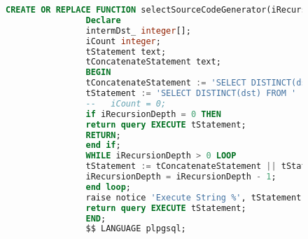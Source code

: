 \documentclass[a4paper,landscape]{scrartcl}
\begin{document}
        \newpage
        \begin{figure}
            \centering
            \begin{lstlisting}[language=SQL,caption = selectSourceCodeGenerator,frame=single]
                CREATE OR REPLACE FUNCTION selectSourceCodeGenerator(iRecursionDepth integer, sTable text) RETURNS SETOF integer AS $$
                Declare
                intermDst_ integer[];
                iCount integer;
                tStatement text;
                tConcatenateStatement text;
                BEGIN
                tConcatenateStatement := 'SELECT DISTINCT(dst) FROM ' || sTable || ' WHERE src IN(';
                tStatement := 'SELECT DISTINCT(dst) FROM ' || sTable || ' WHERE src IN(765)';
                --   iCount = 0;
                if iRecursionDepth = 0 THEN
                return query EXECUTE tStatement;
                RETURN;
                end if;
                WHILE iRecursionDepth > 0 LOOP
                tStatement := tConcatenateStatement || tStatement ||')';
                iRecursionDepth = iRecursionDepth - 1;
                end loop;
                raise notice 'Execute String %', tStatement;
                return query EXECUTE tStatement;
                END;
                $$ LANGUAGE plpgsql;
            \end{lstlisting}
        \end{figure}
\end{document}

